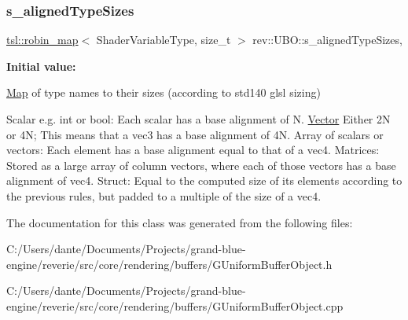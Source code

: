 \subsubsection{\texorpdfstring{s\_alignedTypeSizes}{s\_alignedTypeSizes}}
{\footnotesize\ttfamily \mbox{\hyperlink{classtsl_1_1robin__map}{tsl\+::robin\+\_\+map}}$<$ Shader\+Variable\+Type, size\+\_\+t $>$ rev\+::\+U\+B\+O\+::s\+\_\+aligned\+Type\+Sizes\hspace{0.3cm}{\ttfamily [static]}, {\ttfamily [protected]}}

{\bfseries Initial value\+:}
\begin{DoxyCode}{0}
\DoxyCodeLine{= \{}
\DoxyCodeLine{\}}

\end{DoxyCode}


\mbox{\hyperlink{classrev_1_1_map}{Map}} of type names to their sizes (according to std140 glsl sizing) 

Scalar e.\+g. int or bool\+: Each scalar has a base alignment of N. \mbox{\hyperlink{classrev_1_1_vector}{Vector}} Either 2N or 4N; This means that a vec3 has a base alignment of 4N. Array of scalars or vectors\+: Each element has a base alignment equal to that of a vec4. Matrices\+: Stored as a large array of column vectors, where each of those vectors has a base alignment of vec4. Struct\+: Equal to the computed size of its elements according to the previous rules, but padded to a multiple of the size of a vec4. 

The documentation for this class was generated from the following files\+:\begin{DoxyCompactItemize}
\item 
C\+:/\+Users/dante/\+Documents/\+Projects/grand-\/blue-\/engine/reverie/src/core/rendering/buffers/G\+Uniform\+Buffer\+Object.\+h\item 
C\+:/\+Users/dante/\+Documents/\+Projects/grand-\/blue-\/engine/reverie/src/core/rendering/buffers/G\+Uniform\+Buffer\+Object.\+cpp\end{DoxyCompactItemize}
